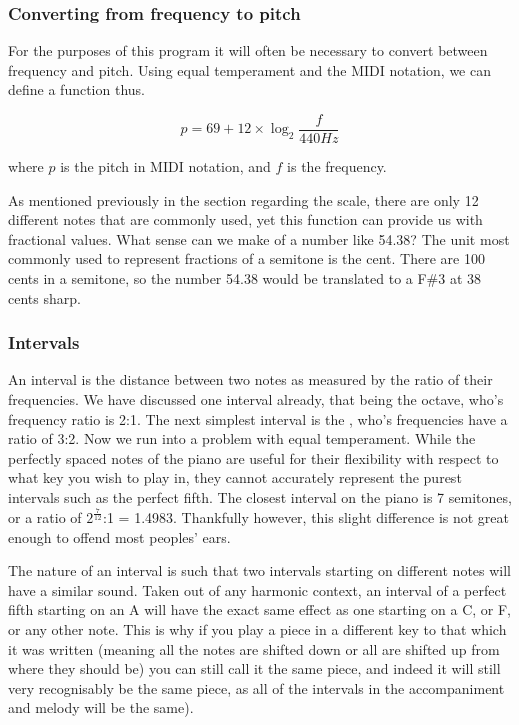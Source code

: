 	
	\subsubsection{Converting from frequency to pitch}
	
	For the purposes of this program it will often be necessary to convert between frequency and pitch. Using equal temperament and the MIDI notation, we can define a function thus.
	
		\[p=69+12\times {\log_2 \frac{f}{440Hz}}\] 
		
	where \(p\) is the pitch in MIDI notation, and \(f\) is the frequency.
	
	As mentioned previously in the section regarding the scale, there are only 12 different notes that are commonly used, yet this function can provide us with fractional values. What sense can we make of a number like 54.38? The unit most commonly used to represent fractions of a semitone is the cent. There are 100 cents in a semitone, so the number 54.38 would be translated to a F\#3 at 38 cents sharp.
	
	\subsubsection{Intervals}
	An interval is the distance between two notes as measured by the ratio of their frequencies. We have discussed one interval already, that being the octave, who's frequency ratio is 2:1. The next simplest interval is the , who's frequencies have a ratio of 3:2. Now we run into a problem with equal temperament. While the perfectly spaced notes of the piano are useful for their flexibility with respect to what key you wish to play in, they cannot accurately represent the purest intervals such as the perfect fifth. The closest interval on the piano is 7 semitones, or a ratio of \(2^\frac{7}{12}\):1 = 1.4983. Thankfully however, this slight difference is not great enough to offend most peoples' ears.
	\par The nature of an interval is such that two intervals starting on different notes will have a similar sound. Taken out of any harmonic context, an interval of a perfect fifth starting on an A will have the exact same effect as one starting on a C, or F, or any other note. This is why if you play a piece in a different key to that which it was written (meaning all the notes are shifted down or all are shifted up from where they should be) you can still call it the same piece, and indeed it will still very recognisably be the same piece, as all of the intervals in the accompaniment and melody will be the same).
